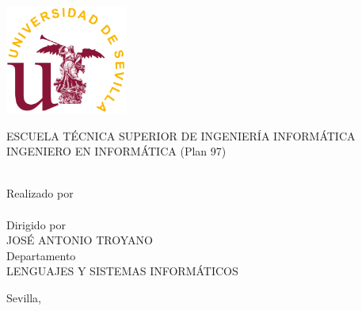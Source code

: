 
\thispagestyle{empty}

\begingroup

\begin{center}
\includegraphics[width=4cm]{logo_us}\\[1.3cm]

\Large

\portadafont

ESCUELA TÉCNICA SUPERIOR DE INGENIERÍA INFORMÁTICA\\[0.8cm]

INGENIERO EN INFORMÁTICA (Plan 97)\\[2.8cm]

\MakeUppercase{\pfctitle}\\[2.7cm]

\large

Realizado por\\[0.1cm]

\MakeUppercase{\pfcauthor}\\[0.8cm]

Dirigido por\\[0.1cm]

JOSÉ ANTONIO TROYANO\\[0.8cm]

Departamento\\[0.1cm]

LENGUAJES Y SISTEMAS INFORMÁTICOS\\[3.6cm]


\end{center}

\begin{flushright}
\portadafont
Sevilla, \pfcdate
\end{flushright}

\endgroup
